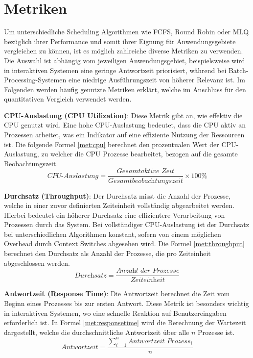 
\section{Metriken}
Um unterschiedliche Scheduling Algorithmen wie \ac{FCFS}, Round Robin oder \ac{MLQ} bezüglich ihrer Performance und somit ihrer Eignung für Anwendungsgebiete vergleichen zu können, ist es möglich zahlreiche diverse Metriken zu verwenden. Die Auswahl ist abhängig vom jeweiligen Anwendungsgebiet, beispielsweise wird in interaktiven Systemen eine geringe Antwortzeit priorisiert, während bei Batch-Processing-Systemen eine niedrige Ausführungszeit von höherer Relevanz ist. Im Folgenden werden häufig genutzte Metriken erklärt, welche im Anschluss für den quantitativen Vergleich verwendet werden.


\textbf{\ac{CPU}-Auslastung (\ac{CPU} Utilization)}: Diese Metrik gibt an, wie effektiv die \ac{CPU} genutzt wird. Eine hohe \ac{CPU}-Auslastung bedeutet, dass die \ac{CPU} aktiv an Prozessen arbeitet, was ein Indikator auf eine effiziente Nutzung der Ressourcen ist. Die folgende Formel \ref{met:cpu} berechnet den prozentualen Wert der \ac{CPU}-Auslastung, zu welcher die \ac{CPU} Prozesse bearbeitet, bezogen auf die gesamte Beobachtungszeit.
\begin{equation}
	\textit{CPU-Auslastung} = \frac{\textit{Gesamtaktive Zeit}}{\textit{Gesamtbeobachtungszeit}} \times 100\%
	\label{met:cpu}
\end{equation}


\textbf{Durchsatz (Throughput)}: Der Durchsatz misst die Anzahl der Prozesse, welche in einer zuvor definierten Zeiteinheit vollständig abgearbeitet werden. Hierbei bedeutet ein höherer Durchsatz eine effizientere Verarbeitung von Prozessen durch das System. Bei vollständiger \ac{CPU}-Auslastung ist der Durchsatz bei unterschiedlichen Algorithmen konstant, sofern von einem möglichen Overhead durch Context Switches abgesehen wird. Die Formel \ref{met:throughput} berechnet den Durchsatz als Anzahl der Prozesse, die pro Zeiteinheit abgeschlossen werden.
\begin{equation}
	\textit{Durchsatz} = \frac{\textit{Anzahl\ der\ Prozesse}}{\textit{Zeiteinheit}}
	\label{met:throughput}
\end{equation}


\textbf{Antwortzeit (Response Time)}: Die Antwortzeit berechnet die Zeit vom Beginn eines Prozesses bis zur ersten Antwort. Diese Metrik ist besonders wichtig in interaktiven Systemen, wo eine schnelle Reaktion auf Benutzereingaben erforderlich ist. In Formel \ref{met:responsetime} wird die Berechnung der Wartezeit dargestellt, welche die durchschnittliche Antwortzeit über alle \( n \) Prozesse ist.
\begin{equation}
	\textit{Antwortzeit} = \frac{\sum_{i=1}^{n} \textit{Antwortzeit Prozess}_{i}}{n}
	\label{met:responsetime}
\end{equation}


